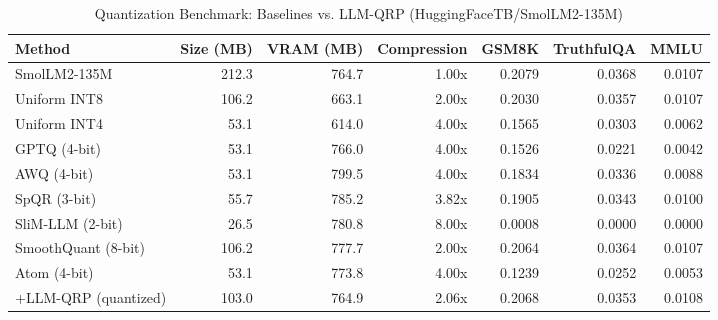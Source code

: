 \begin{table}[htbp]
  \centering
  \small
  \caption{Quantization Benchmark: Baselines vs. LLM-QRP (HuggingFaceTB/SmolLM2-135M)}
  \label{tab:benchmark}
  \begin{tabular}{lrrrrrr}
    \toprule
    \textbf{Method} & \textbf{Size (MB)} & \textbf{VRAM (MB)} & \textbf{Compression} & \textbf{GSM8K} & \textbf{TruthfulQA} & \textbf{MMLU} \\
    \midrule
    SmolLM2-135M & 212.3 & 764.7 & 1.00x & 0.2079 & 0.0368 & 0.0107 \\
    Uniform INT8 & 106.2 & 663.1 & 2.00x & 0.2030 & 0.0357 & 0.0107 \\
    Uniform INT4 & 53.1 & 614.0 & 4.00x & 0.1565 & 0.0303 & 0.0062 \\
    GPTQ (4-bit) & 53.1 & 766.0 & 4.00x & 0.1526 & 0.0221 & 0.0042 \\
    AWQ (4-bit) & 53.1 & 799.5 & 4.00x & 0.1834 & 0.0336 & 0.0088 \\
    SpQR (3-bit) & 55.7 & 785.2 & 3.82x & 0.1905 & 0.0343 & 0.0100 \\
    SliM-LLM (2-bit) & 26.5 & 780.8 & 8.00x & 0.0008 & 0.0000 & 0.0000 \\
    SmoothQuant (8-bit) & 106.2 & 777.7 & 2.00x & 0.2064 & 0.0364 & 0.0107 \\
    Atom (4-bit) & 53.1 & 773.8 & 4.00x & 0.1239 & 0.0252 & 0.0053 \\
    \midrule
    +LLM-QRP (quantized) & 103.0 & 764.9 & 2.06x & 0.2068 & 0.0353 & 0.0108 \\
    \bottomrule
  \end{tabular}
\end{table}
